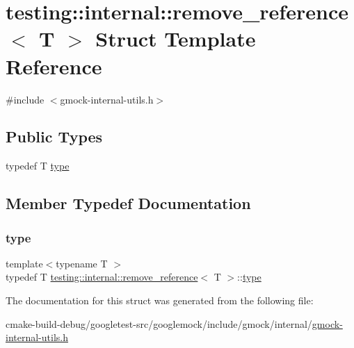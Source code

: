 \hypertarget{structtesting_1_1internal_1_1remove__reference}{}\section{testing\+::internal\+::remove\+\_\+reference$<$ T $>$ Struct Template Reference}
\label{structtesting_1_1internal_1_1remove__reference}


{\ttfamily \#include $<$gmock-\/internal-\/utils.\+h$>$}

\subsection*{Public Types}
\begin{DoxyCompactItemize}
\item 
typedef T \mbox{\hyperlink{structtesting_1_1internal_1_1remove__reference_a291edca52c59a0d211977d4802439b8a}{type}}
\end{DoxyCompactItemize}


\subsection{Member Typedef Documentation}
\mbox{\label{structtesting_1_1internal_1_1remove__reference_a291edca52c59a0d211977d4802439b8a}} 
\subsubsection{\texorpdfstring{type}{type}}
{\footnotesize\ttfamily template$<$typename T $>$ \\
typedef T \mbox{\hyperlink{structtesting_1_1internal_1_1remove__reference}{testing\+::internal\+::remove\+\_\+reference}}$<$ T $>$\+::\mbox{\hyperlink{structtesting_1_1internal_1_1remove__reference_a291edca52c59a0d211977d4802439b8a}{type}}}



The documentation for this struct was generated from the following file\+:\begin{DoxyCompactItemize}
\item 
cmake-\/build-\/debug/googletest-\/src/googlemock/include/gmock/internal/\mbox{\hyperlink{gmock-internal-utils_8h}{gmock-\/internal-\/utils.\+h}}\end{DoxyCompactItemize}
